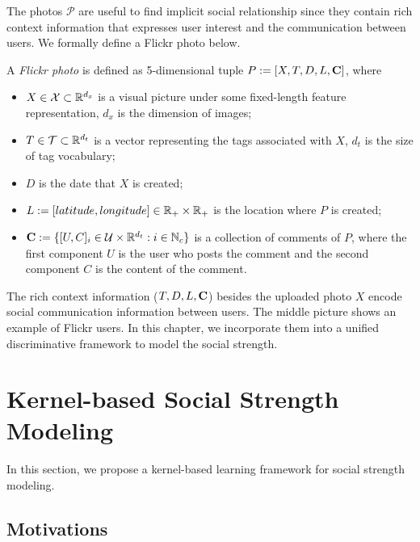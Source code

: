 The photos $\mathcal P$ are useful to find implicit social relationship since they contain rich context information that expresses user interest and the
communication between users. We formally define a Flickr photo below.
\begin{definition}
A {\em Flickr photo} is defined as 5-dimensional tuple $P:=[X, T, D, L, {\bf C}]$, where
\begin{itemize}
  \item $X\in\mathcal X\subset{\mathbb R}^{d_x}$ is a visual picture under some fixed-length feature representation, $d_x$ is the dimension of images;
  \item $T\in\mathcal T\subset{\mathbb R}^{d_t}$ is a vector representing the tags associated with $X$, $d_t$ is the size of tag vocabulary;
  \item $D$ is the date that $X$ is created;
  \item $L:=[latitude, longitude]\in{\mathbb R}_+\times{\mathbb R}_+$ is the location where $P$ is created;
  \item ${\bf C}:=\{[U, C]_i \in \mathcal U \times {\mathbb R}^{d_t}:i\in{\mathbb N}_c\}$ is a collection of comments of $P$, where the first component $U$ is the user who posts
the comment and the second component $C$ is the content of the comment.
\end{itemize}
\end{definition}

The rich context information ($T, D, L, {\bf C}$) besides the uploaded photo $X$ encode social communication information between users. The middle picture shows an example of Flickr users. In this chapter, we incorporate them into a unified discriminative framework to model the social strength.

\section{Kernel-based Social Strength Modeling} \label{sec:ssm-framework}

In this section, we propose a kernel-based learning framework for social strength modeling.

\subsection{Motivations}

